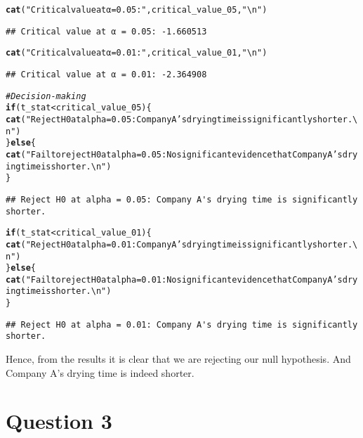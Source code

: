 \documentclass{article}\usepackage[]{graphicx}\usepackage[]{xcolor}
\makeatletter
\newcommand{\hlsng}[1]{\textcolor[rgb]{0.192,0.494,0.8}{#1}}%
\newcommand{\hlcom}[1]{\textcolor[rgb]{0.678,0.584,0.686}{\textit{#1}}}%
\newcommand{\hlopt}[1]{\textcolor[rgb]{0,0,0}{#1}}%
\newcommand{\hldef}[1]{\textcolor[rgb]{0.345,0.345,0.345}{#1}}%
\newcommand{\hlkwa}[1]{\textcolor[rgb]{0.161,0.373,0.58}{\textbf{#1}}}%
\newcommand{\hlkwd}[1]{\textcolor[rgb]{0.737,0.353,0.396}{\textbf{#1}}}%
\newenvironment{kframe}{%
 \def\at@end@of@kframe{}%
 \ifinner\ifhmode%
  \def\at@end@of@kframe{\end{minipage}}%
  \begin{minipage}{\columnwidth}%
 \fi\fi%
 \def\FrameCommand##1{\hskip\@totalleftmargin \hskip-\fboxsep
 \colorbox{shadecolor}{##1}\hskip-\fboxsep
     \hskip-\linewidth \hskip-\@totalleftmargin \hskip\columnwidth}%
 \MakeFramed {\advance\hsize-\width
   \@totalleftmargin\z@ \linewidth\hsize
   \@setminipage}}%
 {\par\unskip\endMakeFramed%
 \at@end@of@kframe}
\newenvironment{knitrout}{}{} %
\makeatother
\begin{document}
\begin{knitrout}
\begin{kframe}
\begin{alltt}
\hlkwd{cat}\hldef{(}\hlsng{"Critical value at α = 0.05:"}\hldef{, critical_value_05,} \hlsng{"\textbackslash{}n"}\hldef{)}
\end{alltt}
\begin{verbatim}
## Critical value at α = 0.05: -1.660513
\end{verbatim}
\begin{alltt}
\hlkwd{cat}\hldef{(}\hlsng{"Critical value at α = 0.01:"}\hldef{, critical_value_01,} \hlsng{"\textbackslash{}n"}\hldef{)}
\end{alltt}
\begin{verbatim}
## Critical value at α = 0.01: -2.364908
\end{verbatim}
\begin{alltt}
\hlcom{# Decision-making}
\hlkwa{if} \hldef{(t_stat} \hlopt{<} \hldef{critical_value_05) \{}
  \hlkwd{cat}\hldef{(}\hlsng{"Reject H0 at alpha = 0.05: Company A's drying time is significantly shorter.\textbackslash{}n"}\hldef{)}
\hldef{\}} \hlkwa{else} \hldef{\{}
  \hlkwd{cat}\hldef{(}\hlsng{"Fail to reject H0 at alpha = 0.05: No significant evidence that Company A's drying time is shorter.\textbackslash{}n"}\hldef{)}
\hldef{\}}
\end{alltt}
\begin{verbatim}
## Reject H0 at alpha = 0.05: Company A's drying time is significantly shorter.
\end{verbatim}
\begin{alltt}
\hlkwa{if} \hldef{(t_stat} \hlopt{<} \hldef{critical_value_01) \{}
  \hlkwd{cat}\hldef{(}\hlsng{"Reject H0 at alpha = 0.01: Company A's drying time is significantly shorter.\textbackslash{}n"}\hldef{)}
\hldef{\}} \hlkwa{else} \hldef{\{}
  \hlkwd{cat}\hldef{(}\hlsng{"Fail to reject H0 at alpha = 0.01: No significant evidence that Company A's drying time is shorter.\textbackslash{}n"}\hldef{)}
\hldef{\}}
\end{alltt}
\begin{verbatim}
## Reject H0 at alpha = 0.01: Company A's drying time is significantly shorter.
\end{verbatim}
\end{kframe}
\end{knitrout}
Hence, from the results it is clear that we are rejecting our null hypothesis. And Company A's drying time is indeed shorter.

\section{Question 3}
\end{document}
